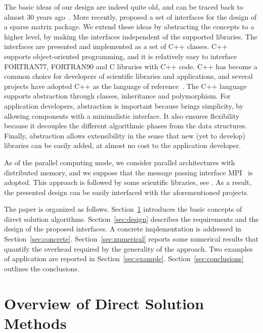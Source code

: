 \documentclass[acmtocl]{acmtrans2m}
\begin{document}
The basic ideas of our design are indeed quite old, and can be traced back to
almost 30 years ago~\cite{duff79performance}. More recently,
\cite{george99object} proposed a set of interfaces for the design of a
sparse matrix package. We extend these ideas by abstracting the concepts to
a higher level, by making the interfaces independent of the supported
libraries. The interfaces are presented and implemented as a
set of C++ classes.  C++~\cite{cppbook}
supports object-oriented programming, and it is relatively easy to interface
FORTRAN77, FORTRAN90 and C libraries with C++ code. C++ has become a common
choice for developers  of scientific libraries and applications, and several
projects have adopted C++ as the language of
reference~\cite{heroux05trilinos}. The C++ language
supports abstraction through classes, inheritance and polymorphism. For
application developers, abstraction is important because brings simplicity,
by allowing components with a minimalistic interface. It also ensures flexibility
because it decouples the different algorithmic phases from the data structures.
Finally, abstraction allows extensibility in the sense that new (yet to
                                                                develop)
libraries can be easily added, at almost no cost to the application developer.

%
%
As of the parallel computing mode, 
we consider parallel architectures with distributed memory, and we suppose
that the message passing interface MPI~\cite{gropp98mpi} is adopted.
This approach is followed by some scientific libraries, see
\cite{heroux05trilinos,petsc-user-ref,falgout02hypre}. As a result, the presented
design can be easily interfaced with the aforementioned projects.

\smallskip

The paper is organized as follows. Section~\ref{sec:overview} introduces the
basic concepts of direct solution algorithms. Section~\ref{sec:design}
describes the requirements and the design of the proposed
interfaces. A concrete implementation is addressed in
Section~\ref{sec:concrete}. Section~\ref{sec:numerical} reports some
numerical results that quantify the overhead required by the generality of
the approach. Two
examples of application are reported in Section~\ref{sec:example}.
Section~\ref{sec:conclusions} outlines the conclusions.

\section{Overview of Direct Solution Methods}
\label{sec:overview}
\end{document}
